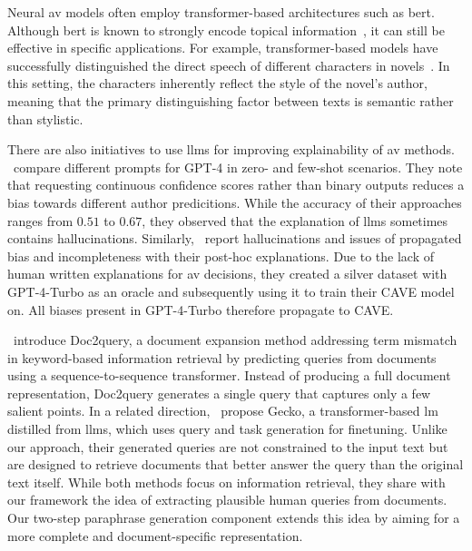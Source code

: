 Neural \ac{av} models often employ transformer-based architectures such as \ac{bert}. 
Although \ac{bert} is known to strongly encode topical information~\citep{sawatphol_cross_topic_av_24}, it can still be effective in specific applications. 
For example, transformer-based models have successfully distinguished the direct speech of different characters in novels~\citep{michel_fictional_2024}. 
In this setting, the characters inherently reflect the style of the novel’s author, meaning that the primary distinguishing factor between texts is semantic rather than stylistic.

There are also initiatives to use \acp{llm} for improving explainability of \ac{av} methods.
\citet{hung_xai_av_llm_2023}\ compare different prompts for GPT-4 in zero- and few-shot scenarios.
They note that requesting continuous confidence scores rather than binary outputs reduces a bias towards different author predicitions.
While the accuracy of their approaches ranges from $0.51$ to $0.67$, they observed that the explanation of \acp{llm} sometimes contains hallucinations.
Similarly, \citet{ramnath_cave_xai_llm_2025}\ report hallucinations and issues of propagated bias and incompleteness with their post-hoc explanations.
Due to the lack of human written explanations for \ac{av} decisions, they created a silver dataset with GPT-4-Turbo as an oracle and subsequently using it to train their CAVE model on.
All biases present in GPT-4-Turbo therefore propagate to CAVE.

\citet{nogueira_doc2query_2019}\ introduce Doc2query, a document expansion method addressing term mismatch in keyword-based information retrieval by predicting queries from documents using a sequence-to-sequence transformer. 
Instead of producing a full document representation, Doc2query generates a single query that captures only a few salient points. 
In a related direction, \citet{lee_gecko_2024}\ propose Gecko, a transformer-based \ac{lm} distilled from \acp{llm}, which uses query and task generation for finetuning. 
Unlike our approach, their generated queries are not constrained to the input text but are designed to retrieve documents that better answer the query than the original text itself. 
While both methods focus on information retrieval, they share with our framework the idea of extracting plausible human queries from documents. 
Our two-step paraphrase generation component \pextractor{} extends this idea by aiming for a more complete and document-specific representation.

